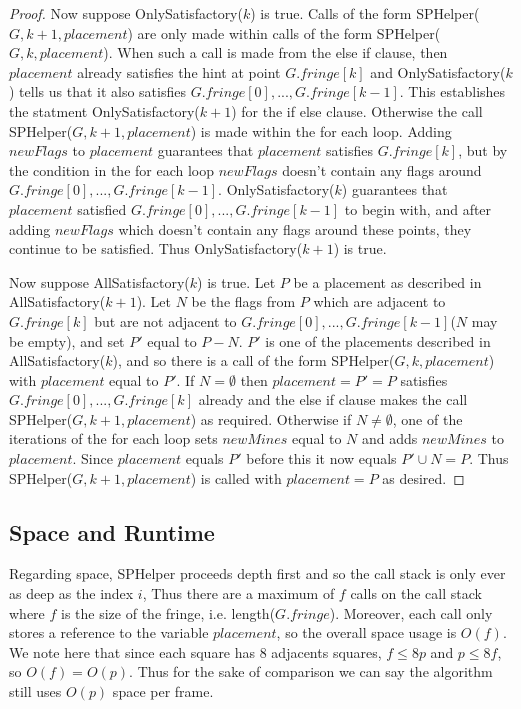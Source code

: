 \documentclass{article}
\theoremstyle{definition}
\theoremstyle{definition}
\theoremstyle{theorem}
\begin{document}
\begin{proof}
		Now suppose OnlySatisfactory($k$) is true. Calls of the form SPHelper($G,k+1,placement$) are only made within calls of the form SPHelper($G,k,placement$). When such a call is made from the else if clause, then $placement$ already satisfies the hint at point $G.fringe[k]$ and OnlySatisfactory($k$) tells us that it also satisfies $G.fringe[0], ..., G.fringe[k-1]$. This establishes the statment OnlySatisfactory($k+1$) for the if else clause. Otherwise the call SPHelper($G,k+1,placement$) is made within the for each loop. Adding $newFlags$ to $placement$ guarantees that $placement$ satisfies $G.fringe[k]$, but by the condition in the for each loop $newFlags$ doesn't contain any flags around $G.fringe[0], ..., G.fringe[k-1]$. OnlySatisfactory($k$) guarantees that $placement$ satisfied $G.fringe[0], ..., G.fringe[k-1]$ to begin with, and after adding $newFlags$ which doesn't contain any flags around these points, they continue to be satisfied. Thus OnlySatisfactory($k + 1$) is true.
		
		Now suppose AllSatisfactory($k$) is true. Let $P$ be a placement as described in AllSatisfactory($k+1$).  Let $N$ be the flags from $P$ which are adjacent to $G.fringe[k]$ but are not adjacent to $G.fringe[0], ..., G.fringe[k-1]$($N$ may be empty), and set $P'$ equal to $P - N$. $P'$ is one of the placements described in AllSatisfactory($k$), and so there is a call of the form SPHelper($G,k,placement$)  with $placement$ equal to $P'$. If $N = \emptyset$ then $placement = P' = P$ satisfies $G.fringe[0], ..., G.fringe[k]$ already and the else if clause makes the call SPHelper($G,k + 1,placement$) as required. Otherwise if $N \neq \emptyset$, one of the iterations of the for each loop sets $newMines$ equal to $N$ and adds $newMines$ to $placement$. Since $placement$ equals $P'$ before this it now equals $P' \cup N = P$. Thus SPHelper($G,k + 1,placement$) is called with $placement = P$ as desired.
	\end{proof}

	\subsection*{Space and Runtime}
	Regarding space, SPHelper proceeds depth first and so the call stack is only ever as deep as the index $i$, Thus there are a maximum of $f$  calls on the call stack where $f$ is the size of the fringe, i.e. length($G.fringe$). Moreover, each call only stores a reference to the variable $placement$, so the overall space usage is $O(f)$. We note here that since each square has 8 adjacents squares, $f \leq 8p$ and $p \leq 8f$, so $O(f) = O(p)$. Thus for the sake of comparison we can say the algorithm still uses $O(p)$ space per frame.
	
\end{document}
